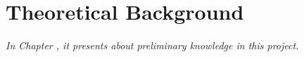 \chapter{Theoretical Background}
\textit{In Chapter \thechapter, it presents about preliminary knowledge in this project.}











